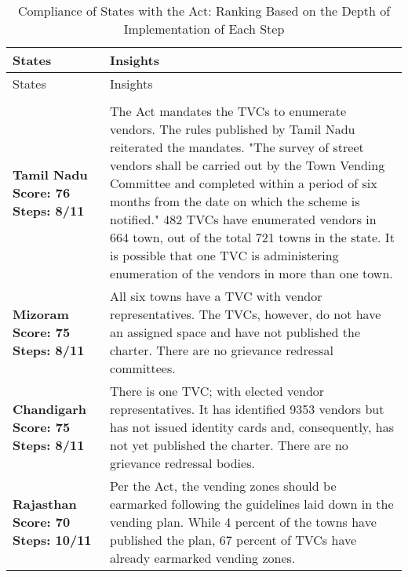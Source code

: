 \documentclass[a4paper, 12pt, twoside]{article}
\begin{document}
\footnotesize
\begin{longtable}[l]{>{\raggedright}p{4cm}>{\raggedright\arraybackslash}p{10cm}}
\caption{Compliance of States with the Act: Ranking Based on the Depth of Implementation of Each Step}\\
	\toprule
	States & Insights \\
	\midrule
	\endfirsthead
	\toprule
	States & Insights \\
	\midrule
	\endhead
	\bottomrule
	\endfoot
	\endlastfoot
	\multicolumn{2}{c}{States with Best Compliance (Index Score Above 70)}\\
	\midrule
\cellcolor{SVACgreen1}\bf{Tamil Nadu}
\newline
Score: 76
\newline
Steps: 8/11
& 
\cellcolor{SVACgreen2}The Act mandates the TVCs to enumerate vendors. The rules published by Tamil Nadu reiterated the mandates. "The survey of street vendors shall be carried out by the Town Vending Committee and completed within a period of six months from the date on which the scheme is notified."  482 TVCs have enumerated vendors in 664 town, out of the total 721 towns in the state.  It is possible that one TVC is administering enumeration of the vendors in more than one town.
\\	
\cellcolor{SVACgreen1}\bf{Mizoram}
\newline
\bf{Score: 75}
\newline
\bf{Steps: 8/11}
& 
\cellcolor{SVACgreen2}All six towns have a TVC with vendor representatives. The TVCs, however, do not have an assigned space and have not published the charter. There are no grievance redressal committees.
\\
\cellcolor{SVACgreen1}\bf{Chandigarh}
\newline
\bf{Score: 75}
\newline
\bf{Steps: 8/11}
& 
\cellcolor{SVACgreen2}There is one TVC; with elected vendor representatives. It has identified 9353 vendors but has not issued identity cards and, consequently, has not yet published the charter. There are no grievance redressal bodies. 
\\
\cellcolor{SVACgreen1}\bf{Rajasthan}
\newline
\bf{Score: 70}
\newline
\bf{Steps: 10/11}
&
\cellcolor{SVACgreen2}Per the Act, the vending zones should be earmarked following the guidelines laid down in the vending plan. While 4 percent of the towns have published the plan, 67 percent of TVCs have already earmarked vending zones.	

\end{longtable}
\end{document}
